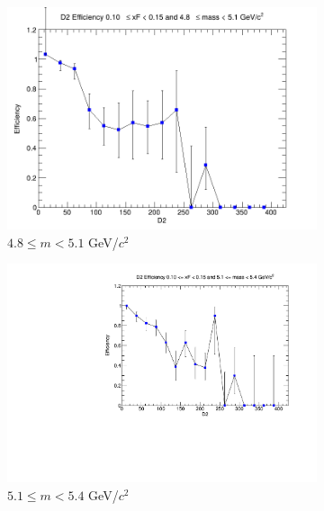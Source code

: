 \documentclass[11pt]{article}
\begin{document}
\begin{figure}[p]
\begin{subfigure}[b]{0.32\textwidth}
        \includegraphics[width=\textwidth]{./kTrackerEfficiencyPlots/D2_Efficiency_xF2_mass2.png}
        \caption{$4.8 \leq m < 5.1$ GeV/$c^2$}
    \end{subfigure}\vspace{0.5cm}
    \begin{subfigure}[b]{0.32\textwidth}
        \centering
        \includegraphics[width=\textwidth]{./kTrackerEfficiencyPlots/D2_Efficiency_xF2_mass3.pdf}
        \caption{$5.1 \leq m < 5.4$ GeV/$c^2$}
    \end{subfigure}\hfill
    \begin{subfigure}[b]{0.32\textwidth}
        \centering

\end{subfigure}
\end{figure}
\end{document}
